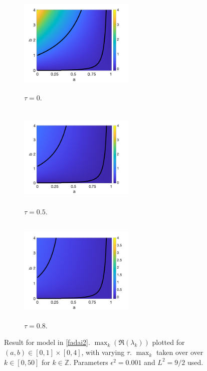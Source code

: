 \begin{figure}[H]
    \centering
    \begin{subfigure}[t]{0.32\textwidth}
        \centering
        \includegraphics[width=5.5cm,height = 5cm]{f1t0.png}
        \caption{$\tau=0$.}
        \label{}
    \end{subfigure}
    \hfill
    \begin{subfigure}[t]{0.32\textwidth}
        \centering
        \includegraphics[width=5.5cm,height = 5cm]{f2t05.png}
        \caption{$\tau=0.5$.}
        \label{}
    \end{subfigure}
    \hfill
    \begin{subfigure}[t]{0.32\textwidth}
        \centering
        \includegraphics[width=5.5cm,height = 5cm]{f2t08.png}
        \caption{$\tau=0.8$.}
        \label{}
    \end{subfigure}
    \caption{Result for model in \eqref{fadai2}. $\max_k(\Re(\lambda_k))$ plotted for $(a,b)\in[0,1]\times[0,4]$, with varying $\tau$. $\max_k$ taken over over $k\in[0,50]$ for $k\in\mathbb{Z}$. Parameters $\epsilon^2=0.001$ and $L^2=9/2$ used.}
    \label{fig:fad2}
\end{figure}
